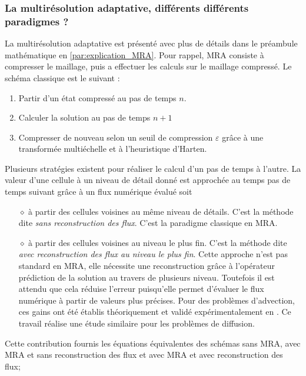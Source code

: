         \subsubsection{La multirésolution adaptative, différents différents paradigmes ?}
            La multirésolution adaptative est présenté avec plus de détails dans le préambule mathématique en \ref{par:explication_MRA}.    
            Pour rappel, MRA consiste à compresser le maillage, puis a effectuer les calculs sur le maillage compressé.
            Le schéma classique est le suivant : 
            \begin{enumerate}
                \item Partir d'un état compressé au pas de temps $n$.
                \item Calculer la solution au pas de temps $n+1$
                \item Compresser de nouveau selon un seuil de compression $\varepsilon$ grâce à une transformée multiéchelle et à l'heuristique d'Harten.
            \end{enumerate}
            Plusieurs stratégies existent pour réaliser le calcul d'un pas de temps à l'autre. La valeur d'une cellule à un niveau de détail donné est approchée au temps pas de temps suivant
            grâce à un flux numérique évalué soit
            \begin{itemize}
                \item[$\diamond$] à partir des cellules voisines au même niveau de détails. C'est la méthode dite \textit{sans reconstruction des flux}. C'est la paradigme classique en MRA.
                \item[$\diamond$] à partir des cellules voisines au niveau le plus fin. C'est la méthode dite \textit{avec reconstruction des flux au niveau le plus fin}.
                Cette approche n'est pas standard en MRA, elle nécessite une reconstruction grâce à l'opérateur prédiction de la solution au travers de plusieurs niveau. 
                Toutefois il est attendu que cela réduise l'erreur puisqu'elle permet d'évaluer le flux numérique à partir de valeurs plus précises.
                Pour des problèmes d'advection, ces gains ont été établis théoriquement et validé expérimentalement en \cite{belloti_et_al_2025}.
                Ce travail réalise une étude similaire pour les problèmes de diffusion.
            \end{itemize}
            Cette contribution fournis les équations équivalentes des schémas sans MRA, avec MRA et sans reconstruction des flux et avec MRA et avec reconstruction des flux;
